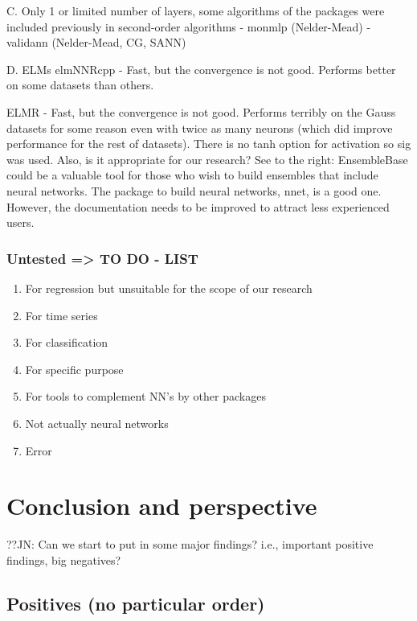 C. Only 1 or limited number of layers, some algorithms of the packages
were included previously in second-order algorithms - monmlp
(Nelder-Mead) - validann (Nelder-Mead, CG, SANN)

D. ELMs elmNNRcpp - Fast, but the convergence is not good. Performs
better on some datasets than others.

ELMR - Fast, but the convergence is not good. Performs terribly on the
Gauss datasets for some reason even with twice as many neurons (which
did improve performance for the rest of datasets). There is no tanh
option for activation so sig was used. Also, is it appropriate for our
research? See to the right: EnsembleBase could be a valuable tool for
those who wish to build ensembles that include neural networks. The
package to build neural networks, nnet, is a good one. However, the
documentation needs to be improved to attract less experienced users.

\hypertarget{untested-to-do---list}{%
\subsubsection{Untested =\textgreater{} TO DO -
LIST}\label{untested-to-do---list}}

\begin{enumerate}
\def\labelenumi{\arabic{enumi}.}
\tightlist
\item
  For regression but unsuitable for the scope of our research
\item
  For time series
\item
  For classification
\item
  For specific purpose
\item
  For tools to complement NN's by other packages
\item
  Not actually neural networks
\item
  Error
\end{enumerate}

\hypertarget{conclusion-and-perspective}{%
\section{Conclusion and perspective}\label{conclusion-and-perspective}}

??JN: Can we start to put in some major findings? i.e., important
positive findings, big negatives?

\hypertarget{positives-no-particular-order}{%
\subsection{Positives (no particular
order)}\label{positives-no-particular-order}}

